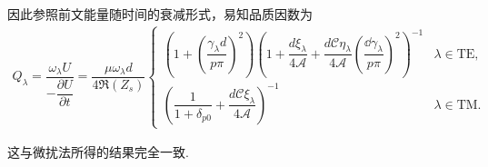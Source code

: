 \begin{note}
	因此参照前文能量随时间的衰减形式，易知品质因数为
	\begin{align*}
		Q_\lambda = \dfrac{\omega_\lambda U}{- \dfrac{\partial U}{\partial t} } = \dfrac{\mu \omega_\lambda d}{4 \Re(Z_s)}
		\begin{cases}
			\left( 1 + \left( \dfrac{\gamma_\lambda d}{p\pi} \right)^2 \right) \left( 1 + \dfrac{d \xi_\lambda}{4 \mathcal{A}} + \dfrac{d \mathcal{C} \eta_\lambda}{4 \mathcal{A}} \left( \dfrac{\dd \gamma_\lambda}{p\pi} \right)^2 \right)^{-1} & \lambda \in \text{TE}, \\[8pt]
			\left( \dfrac{1}{1 + \delta_{p0}} + \dfrac{d \mathcal{C} \xi_\lambda}{4 \mathcal{A}} \right)^{-1}                                                                                                                                    & \lambda \in \text{TM}.
		\end{cases}
	\end{align*}

	这与微扰法所得的结果完全一致.
\end{note}

